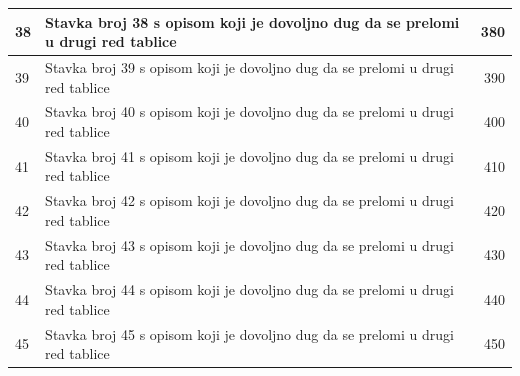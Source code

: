 \documentclass[a4paper]{article}
\begin{document}
\begin{longtable}{|l|p{6cm}|r|}
\hline
38 & Stavka broj 38 s opisom koji je dovoljno dug da se prelomi u drugi red tablice & 380 \\
\hline
39 & Stavka broj 39 s opisom koji je dovoljno dug da se prelomi u drugi red tablice & 390 \\
\hline
40 & Stavka broj 40 s opisom koji je dovoljno dug da se prelomi u drugi red tablice & 400 \\
\hline
41 & Stavka broj 41 s opisom koji je dovoljno dug da se prelomi u drugi red tablice & 410 \\
\hline
42 & Stavka broj 42 s opisom koji je dovoljno dug da se prelomi u drugi red tablice & 420 \\
\hline
43 & Stavka broj 43 s opisom koji je dovoljno dug da se prelomi u drugi red tablice & 430 \\
\hline
44 & Stavka broj 44 s opisom koji je dovoljno dug da se prelomi u drugi red tablice & 440 \\
\hline
45 & Stavka broj 45 s opisom koji je dovoljno dug da se prelomi u drugi red tablice & 450 \\
\hline
\end{longtable}
\end{document}
